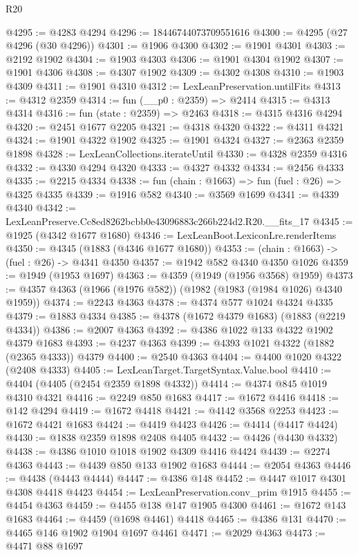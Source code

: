 \begin{lexlean}{R20}
\begin{coremodule}
@4295 := @4283 @4294
@4296 := 18446744073709551616
@4300 := @4295 (@27 @4296 (@30 @4296))
@4301 := @1906 @4300
@4302 := @1901 @4301
@4303 := @2192 @1902
@4304 := @1903 @4303
@4306 := @1901 @4304 @1902
@4307 := @1901 @4306
@4308 := @4307 @1902
@4309 := @4302 @4308
@4310 := @1903 @4309
@4311 := @1901 @4310
@4312 := LexLeanPreservation.untilFits
@4313 := @4312 @2359
@4314 := fun (__p0 : @2359) => @2414
@4315 := @4313 @4314
@4316 := fun (state : @2359) => @2463
@4318 := @4315 @4316 @4294
@4320 := @2451 @1677 @2205
@4321 := @4318 @4320
@4322 := @4311 @4321
@4324 := @1901 @4322 @1902
@4325 := @1901 @4324
@4327 := @2363 @2359 @1898
@4328 := LexLeanCollections.iterateUntil
@4330 := @4328 @2359 @4316
@4332 := @4330 @4294 @4320
@4333 := @4327 @4332
@4334 := @2456 @4333
@4335 := @2215 @4334
@4338 := fun (chain : @1663) => fun (fuel : @26) => @4325 @4335
@4339 := @1916 @582
@4340 := @3569 @1699
@4341 := @4339 @4340
@4342 := LexLeanPreserve.Cc8ed8262bcbb0e43096883c266b224d2.R20.__fits_17
@4345 := @1925 (@4342 @1677 @1680)
@4346 := LexLeanBoot.LexiconLre.renderItems
@4350 := @4345 (@1883 (@4346 @1677 @1680))
@4353 := (chain : @1663) -> (fuel : @26) -> @4341 @4350
@4357 := @1942 @582 @4340 @4350 @1026
@4359 := @1949 (@1953 @1697)
@4363 := @4359 (@1949 (@1956 @3568) @1959)
@4373 := @4357 @4363 (@1966 (@1976 @582)) (@1982 (@1983 (@1984 @1026) @4340 @1959))
@4374 := @2243 @4363
@4378 := @4374 @577 @1024 @4324 @4335
@4379 := @1883 @4334
@4385 := @4378 (@1672 @4379 @1683) (@1883 (@2219 @4334))
@4386 := @2007 @4363
@4392 := @4386 @1022 @133 @4322 @1902 @4379 @1683
@4393 := @4237 @4363
@4399 := @4393 @1021 @4322 (@1882 (@2365 @4333)) @4379
@4400 := @2540 @4363
@4404 := @4400 @1020 @4322 (@2408 @4333)
@4405 := LexLeanTarget.TargetSyntax.Value.bool
@4410 := @4404 (@4405 (@2454 @2359 @1898 @4332))
@4414 := @4374 @845 @1019 @4310 @4321
@4416 := @2249 @850 @1683
@4417 := @1672 @4416
@4418 := @142 @4294
@4419 := @1672 @4418
@4421 := @4142 @3568 @2253
@4423 := @1672 @4421 @1683
@4424 := @4419 @4423
@4426 := @4414 (@4417 @4424)
@4430 := @1838 @2359 @1898 @2408 @4405
@4432 := @4426 (@4430 @4332)
@4438 := @4386 @1010 @1018 @1902 @4309 @4416 @4424
@4439 := @2274 @4363
@4443 := @4439 @850 @133 @1902 @1683
@4444 := @2054 @4363
@4446 := @4438 (@4443 @4444)
@4447 := @4386 @148
@4452 := @4447 @1017 @4301 @4308 @4418 @4423
@4454 := LexLeanPreservation.conv_prim @1915
@4455 := @4454 @4363
@4459 := @4455 @138 @147 @1905 @4300
@4461 := @1672 @143 @1683
@4464 := @4459 (@1698 @4461) @4418
@4465 := @4386 @131
@4470 := @4465 @146 @1902 @1904 @1697 @4461
@4471 := @2029 @4363
@4473 := @4471 @88 @1697

\end{coremodule}
\end{lexlean}
